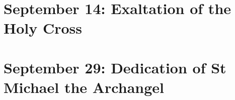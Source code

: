 {%
{
\section{September 14: Exaltation of the Holy Cross}
\subtitle{ Class, Red}
\subtitle{I \& II Vespers}

\def\definevesperspropers{}
\def\definevesperspropersalt{%
}
\def\vesperspropersnote{At II Vespers:}
\def\vesperspropersaltnote{At I Vespers:}
\def\postpsalmtitlethree{\oldneedspace{9\baselineskip}}
\def\prerepeatantiphonthree{}
\def\prepsalmthreeverses{\vspace{-0.1\baselineskip}}
\def\prepsalmtitlefour{\oldneedspace{8\baselineskip}}
\def\prepsalmfourverses{\oldneedspace{2\baselineskip}}
\def\prehymntranslation{\oldneedspace{3\baselineskip}}

\def\begincollectcols{\begin{parcolumns}[rulebetween,colwidths={1=0.42\linewidth}]{2}}
\bigskip
\benedicamusdomino[2]{}
}

{
\section{September 29: Dedication of St Michael the Archangel}
\subtitle{ Class, White or Gold}
\vspace{-0.5\baselineskip}
\subtitle{I \& II Vespers}
\def\postdeusinadjutorium{\pagebreak}

\def\definevesperspropers{
  \def\prepsalmtitlefive{\bigskip}
  \def\vrlinebreak{F}
}
\def\definevesperspropersalt{}
\def\vesperspropersnote{At II Vespers:\medskip}
\def\vesperspropersaltnote{At I Vespers:\medskip}
\def\prepsalmtitleone{\vspace{-0.5\baselineskip}}
\def\prechapter{\vspace{-0.5\baselineskip}}


\medskip
\printnote{\sundaycommemnote{}

}}}
